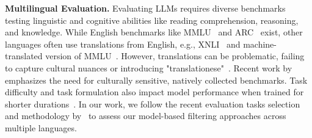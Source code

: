 \textbf{Multilingual Evaluation.} Evaluating LLMs requires diverse benchmarks testing linguistic and cognitive abilities like reading comprehension, reasoning, and knowledge.  While English benchmarks like MMLU~\citep{hendrycks2020measuring} and ARC~\citep{clark2018thinksolvedquestionanswering} exist, other languages often use translations from English, e.g., XNLI~\citep{conneau-etal-2018-xnli} and machine-translated version of MMLU~\citep{lai-etal-2023-okapi}. However, translations can be problematic, failing to capture cultural nuances or introducing "translationese"~\citep{romanou2024include}. Recent work by~\citet{romanou2024include,singh2024globalmmluunderstandingaddressing} emphasizes the need for culturally sensitive, natively collected benchmarks. Task difficulty and task formulation also impact model performance when trained for shorter durations~\citep{kydlicek2024finetasksmultilingualtasks}. In our work, we follow the recent evaluation tasks selection and methodology by~\citet{kydlicek2024finetasksmultilingualtasks} to assess our model-based filtering approaches across multiple languages.